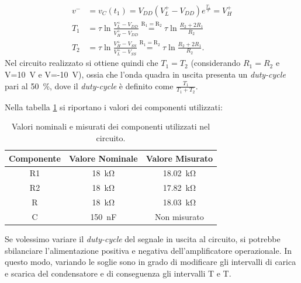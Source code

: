 \begin{equation}
	\begin{split}
		v^-&=v_C(t_1)=V_{DD}(V_L^+-V_{DD})e^{\frac{T_1}{\tau}}=V_H^+ \\
		T_1&=\tau \ln{\frac{V_L^+-V_{DD}}{V_H^+-V_{DD}}}\overset{\mathrm{R_1=R_2}}{=}\tau \ln{\frac{R_2+2R_1}{R_2}} \\
		T_2&=\tau \ln{\frac{V_H^+-V_{SS}}{V_L^+-V_{SS}}}\overset{\mathrm{R_1=R_2}}{=}\tau \ln{\frac{R_2+2R_1}{R_2}}.
	\end{split}
\end{equation}
Nel circuito realizzato si ottiene quindi che $T_1=T_2$ (considerando $R_1=R_2$ e V=\SI{10}{\volt} e V=-\SI{10}{\volt}), ossia che l'onda quadra in uscita presenta un \textit{duty-cycle} pari al \SI{50}{\percent}, dove il \textit{duty-cycle} è definito come $\frac{T_1}{T_1+T_2}$.

\noindent
Nella tabella \ref{tab:valori_componenti_3} si riportano i valori dei componenti utilizzati:

\def\arraystretch{1.3}
\begin{table}[h]
	\centering
	\begin{tabular}{|c|c|c|}
		\hline
		Componente	& Valore Nominale & Valore Misurato \\ \hline
		R1 &\SI{18}{\kilo\ohm} & \SI{18,02}{\kilo\ohm} \\ \hline
		R2 &\SI{18}{\kilo\ohm} & \SI{17,82}{\kilo\ohm} \\ \hline
		R & \SI{18}{\kilo\ohm} & \SI{18,03}{\kilo\ohm} \\ \hline
		C & \SI{150}{\nano\farad} & Non misurato \\ \hline
	\end{tabular}
	\caption{Valori nominali e misurati dei componenti utilizzati nel circuito.}
	\label{tab:valori_componenti_3}
\end{table}

\noindent
Se volessimo variare il \textit{duty-cycle} del segnale in uscita al circuito, si potrebbe sbilanciare l'alimentazione positiva e negativa dell'amplificatore operazionale. In questo modo, variando le soglie sono in grado di modificare gli intervalli di carica e scarica del condensatore e di conseguenza gli intervalli T e T.

